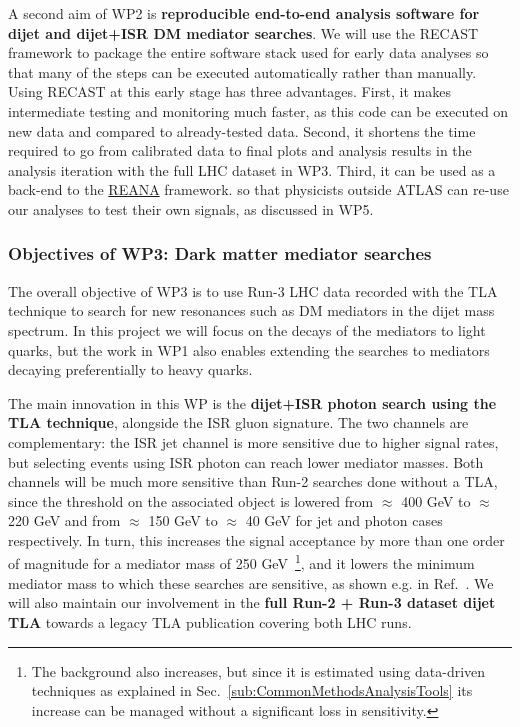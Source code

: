 A second aim of WP2 is \textbf{reproducible end-to-end analysis software for dijet and dijet+ISR DM mediator searches}. 
We will use the RECAST framework to package the entire software stack used for early data analyses so that many of the steps can be executed automatically rather than manually.
Using RECAST at this early stage has three advantages. 
First, it makes intermediate testing and monitoring much faster, as this code can be executed on new data and compared to already-tested data. 
Second, it shortens the time required to go from calibrated data to final plots and analysis results in the analysis iteration with the full LHC dataset in WP3.
Third, it can be used as a back-end to the \href{http://reanahub.io/#documentation}{REANA} framework. %
so that physicists outside ATLAS can re-use our analyses to test their own signals, as discussed in WP5.  

\subsubsection{Objectives of WP3: Dark matter mediator searches}

The overall objective of WP3 is to use Run-3 LHC data recorded with the TLA technique to search for new resonances such as DM mediators in the dijet mass spectrum.
In this project we will focus on the decays of the mediators to light quarks, but the work in WP1 also enables extending the searches to mediators decaying preferentially to heavy quarks. 

The main innovation in this WP is the \textbf{dijet+ISR photon search using the TLA technique}, alongside the ISR gluon signature. 
The two channels are complementary: the ISR jet channel is more sensitive due to higher signal rates, but selecting events using ISR photon can reach lower mediator masses. 
Both channels will be much more sensitive than Run-2 searches done without a TLA, since the threshold on the associated object is lowered from $\approx$ 400 GeV to $\approx$ 220 GeV and from $\approx$ 150 GeV to $\approx$ 40 GeV for jet and photon cases respectively.  
In turn, this increases the signal acceptance by more than one order of magnitude for a mediator mass of 250 GeV~\footnote{The background also increases, but since it is estimated using data-driven techniques as explained in Sec.~\ref{sub:CommonMethodsAnalysisTools} its increase can be managed without a significant loss in sensitivity.}, 
and it lowers the minimum mediator mass to which these searches are sensitive, as shown e.g. in Ref.~\cite{Sirunyan:2019pnb}.%
We will also maintain our involvement in the \textbf{full Run-2 + Run-3 dataset dijet TLA} towards a legacy TLA publication covering both LHC runs.

